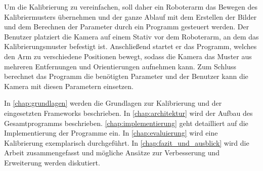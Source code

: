 Um die Kalibrierung zu vereinfachen, soll daher ein Roboterarm das Bewegen des Kalibriermusters übernehmen und der ganze Ablauf mit dem Erstellen der Bilder und dem Berechnen der Parameter durch ein Programm gesteuert werden. Der Benutzer platziert die Kamera auf einem Stativ vor dem Roboterarm, an dem das Kalibrierungsmuster befestigt ist. Anschließend startet er das Programm, welches den Arm zu verschiedene Positionen bewegt, sodass die Kamera das Muster aus mehreren Entfernungen und Orientierungen aufnehmen kann. Zum Schluss berechnet das Programm die benötigten Parameter und der Benutzer kann die Kamera mit diesen Parametern einsetzen.

In \autoref{chap:grundlagen} werden die Grundlagen zur Kalibrierung und der eingesetzten Frameworks beschrieben. In \autoref{chap:architektur} wird der Aufbau des Gesamtprogramms beschrieben. \autoref{chap:implementierung} geht detailliert auf die Implementierung der Programme ein. In \autoref{chap:evaluierung} wird eine Kalibrierung exemplarisch durchgeführt. In \autoref{chap:fazit_und_ausblick} wird die Arbeit zusammengefasst und mögliche Ansätze zur Verbesserung und Erweiterung werden diskutiert.